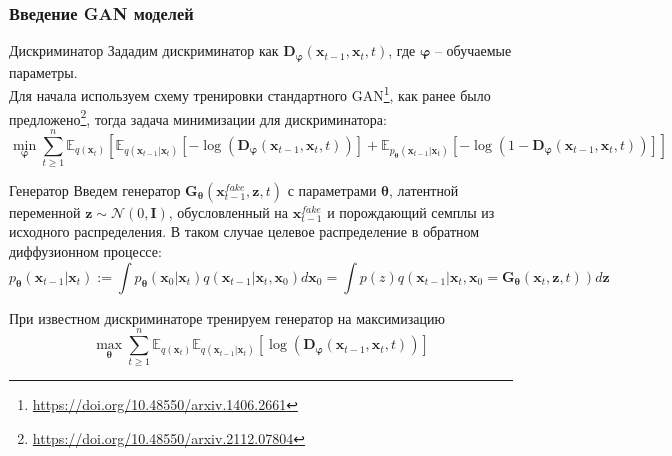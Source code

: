 \documentclass[8pt]{beamer}
\begin{document}
\begin{frame}
	\frametitle{Введение GAN моделей}
	\begin{block}{Дискриминатор}
		Зададим дискриминатор как $\textbf{D}_{\boldsymbol{\varphi}}(\textbf{x}_{t-1}, \textbf{x}_t, t)$, где ${\boldsymbol{\varphi}}$ -- обучаемые параметры.\\
		Для начала используем схему тренировки стандартного GAN\footnote{\url{https://doi.org/10.48550/arxiv.1406.2661}}, как ранее было предложено\footnote{\url{https://doi.org/10.48550/arxiv.2112.07804}}, тогда задача минимизации для дискриминатора:
		$$  \min\limits_{\boldsymbol{\varphi}}\sum\limits_{t\geqslant 1}^n \mathbb{E}_{q(\textbf{x}_t)}[\mathbb{E}_{q(\textbf{x}_{t-1}|\textbf{x}_t)}[-\log{ (\textbf{D}_{\boldsymbol{\varphi}}(\textbf{x}_{t-1}, \textbf{x}_t, t) ) }] + \mathbb{E}_{p_{\boldsymbol{\theta}}(\textbf{x}_{t-1}|\textbf{x}_t)}[-\log{  (1 - \textbf{D}_{\boldsymbol{\varphi}}(\textbf{x}_{t-1}, \textbf{x}_t, t))  }]]$$
		\end{block}
		
	\begin{block}{Генератор}
		Введем генератор $\textbf{G}_{\boldsymbol{\theta}}(\textbf{x}_{t-1}^{fake}, \textbf{z}, t)$ с параметрами ${\boldsymbol{\theta}}$, латентной переменной $\textbf{z}\sim \mathcal{N}(0, \textbf{I})$, обусловленный на $\textbf{x}_{t-1}^{fake}$ и порождающий семплы из исходного распределения. В таком случае целевое распределение в обратном диффузионном процессе:
		$$p_{\boldsymbol{\theta}}(\textbf{x}_{t-1}|\textbf{x}_t) := \int p_{\boldsymbol{\theta}}(\textbf{x}_0|\textbf{x}_t)q(\textbf{x}_{t-1}|\textbf{x}_t, \textbf{x}_0)d\textbf{x}_0 =\int p(z)q(\textbf{x}_{t-1}|\textbf{x}_t, \textbf{x}_0 = \textbf{G}_{\boldsymbol{\theta}}(\textbf{x}_t, \textbf{z}, t))d\textbf{z}$$
	\end{block}
		При известном дискриминаторе тренируем генератор на максимизацию 
		\begin{equation*}
			\max\limits_{\boldsymbol{\theta}}\sum\limits_{t\geqslant 1}^n \mathbb{E}_{q(\textbf{x}_t)}\mathbb{E}_{q(\textbf{x}_{t-1}|\textbf{x}_t)}[\log{(\textbf{D}_{\boldsymbol{\varphi}}(\textbf{x}_{t-1}, \textbf{x}_t, t))}]
		\end{equation*}
\end{frame}
\end{document}
